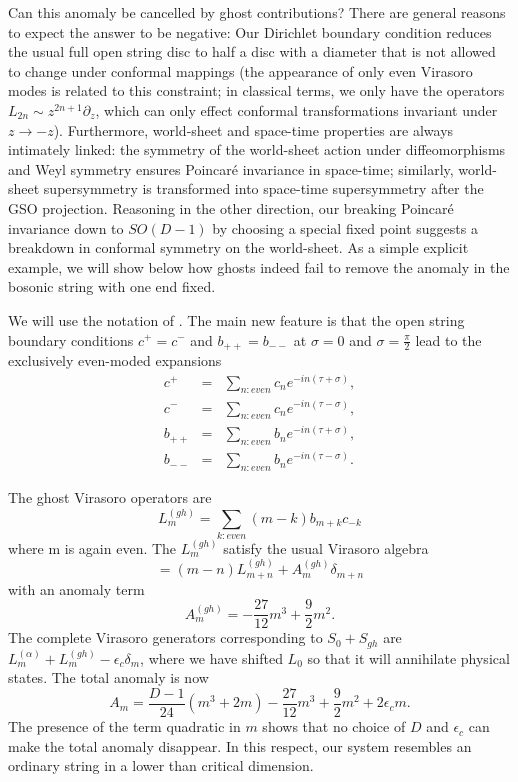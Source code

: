 \documentclass[a4paper,a4paper]{article}
\begin{document}
Can this anomaly be cancelled by ghost contributions?  There are
general reasons to expect the answer to be negative: Our Dirichlet
boundary condition reduces the usual full open string disc to half
a disc with a diameter that is not allowed to change under
conformal mappings (the appearance of only even Virasoro modes is
related to this constraint; in classical terms, we only have the
operators $L_{2n} \sim z^{2n+1}
\partial_z $, which can only effect conformal transformations invariant
under $z\rightarrow -z$).  Furthermore, world-sheet and space-time
properties are always intimately linked: the symmetry of the
world-sheet  action under diffeomorphisms and Weyl symmetry
ensures Poincar\'{e} invariance in space-time; similarly, world-sheet
supersymmetry is transformed into space-time supersymmetry after
the GSO projection. Reasoning in the other direction, our breaking
Poincar\'{e} invariance down to $SO(D-1)$ by choosing a special fixed
point suggests a breakdown in conformal symmetry on the world-sheet. As a
simple explicit example, we will show below how ghosts indeed fail to
remove the anomaly in the bosonic string with one end fixed.

We will use the notation of \cite{GSW}. The main new feature is
that the open string boundary conditions $c^{+}=c^{-}$ and
$b_{++}=b_{--}$ at $\sigma=0$ and $\sigma=\frac{\pi}{2}$ lead to
the exclusively even-moded expansions
\begin{eqnarray}
c^{+}&=&\sum_{n:even}c_{n}e^{-in(\tau+\sigma)},\\
c^{-}&=&\sum_{n:even}c_{n}e^{-in(\tau-\sigma)},\\
b_{++}&=&\sum_{n:even}b_{n}e^{-in(\tau+\sigma)},\\
b_{--}&=&\sum_{n:even}b_{n}e^{-in(\tau-\sigma)}.
\end{eqnarray}

The ghost Virasoro operators are
\begin{equation}
L_{m}^{(gh)}=\sum_{k:even}(m-k)b_{m+k}c_{-k}
\end{equation}
where  m is again even.  The $L_{m}^{(gh)}$ satisfy the usual
Virasoro algebra
\begin{equation}
[L_{m}^{(gh)},L_{n}^{(gh)}]=(m-n)L_{m+n}^{(gh)}+A_{m}^{(gh)}\delta_{m+n}
\end{equation}
with an anomaly term
\begin{equation}
A_{m}^{(gh)}=-\frac{27}{12}m^{3}+\frac{9}{2}m^{2}.
\end{equation}
The complete Virasoro generators corresponding to $S_{0}+S_{gh}$
are  $L_{m}^{(\alpha)}+L_{m}^{(gh)}-\epsilon_c\delta_{m}$, where
we have shifted $L_0$ so that it will annihilate physical states.
The total anomaly is now
\begin{equation}
A_{m}=\frac{D-1}{24}(m^{3}+2m)-\frac{27}{12}m^{3}+\frac{9}{2}m^{2}+
2\epsilon_c m.
\end{equation}
The presence of the term quadratic in $m$ shows that no choice of
$D$ and $\epsilon_c$ can make the total anomaly disappear.  In this
respect, our system resembles an ordinary string in a lower than
critical dimension.
\end{document}
